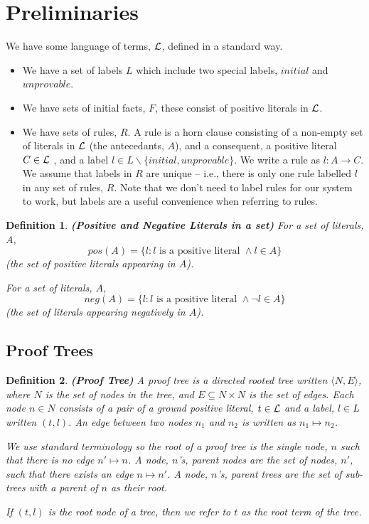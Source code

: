 \documentclass{blue-book}
\newtheorem{definition}{Definition}
\newcommand{\drule}[3]{\ensuremath{#1:#2 \rightarrow #3}}
\newcommand{\pt}[2]{\ensuremath{\langle #1,#2 \rangle}}
\newcommand{\node}[2]{\ensuremath{(#1, #2)}}
\newcommand{\edge}[2]{\ensuremath{#1 \mapsto #2}}
\begin{document}
\section{Preliminaries}
We have some language of terms, ${\cal L}$, defined in a standard way.

\begin{itemize}
\item We have a set of labels $L$ which include two special labels, $initial$ and $unprovable$. 

\item We have sets of initial facts, $F$, these consist of positive literals in ${\cal L}$.

\item We have sets of rules, $R$.  A rule is a horn clause consisting of a non-empty set of literals in ${\cal L}$ (the antecedants, $A$), and a consequent, a positive literal $C \in {\cal L}$ , and a label $l \in L \backslash \{initial, unprovable\}$.  We write a rule as $\drule{l}{A}{C}$.  We assume that labels in $R$ are unique -- i.e., there is only one rule labelled $l$ in any set of rules, $R$.  Note that we don't need to label rules for our system to work, but labels are a useful convenience when referring to rules.
\end{itemize}

\begin{definition}{\bf (Positive and Negative Literals in a set)}
For a set of literals, $A$, $$pos(A) = \{l: l \text{ is a positive literal } \wedge l \in A\}$$ (the set of positive literals appearing in $A$).

For a set of literals, $A$, $$neg(A) = \{l: l \text{ is a positive literal } \wedge \neg l \in A\}$$ (the set of literals appearing negatively in $A$).
\end{definition}

\subsection{Proof Trees}

\begin{definition}{\bf (Proof Tree)}
\label{def:proof_tree}
A proof tree is a directed rooted tree written $\pt{N}{E}$, where $N$ is the set of nodes in the tree, and $E \subseteq N \times N$ is the set of edges.  Each node $n \in N$ consists of a pair of a ground positive literal, $t \in {\cal L}$ and a label, $l \in L$ written $\node{t}{l}$.  An edge between two nodes $n_1$ and $n_2$ is written as $\edge{n_1}{n_2}$.

We use standard terminology so the root of a proof tree is the single node, $n$ such that there is no edge $\edge{n'}{n}$.  A node, $n$'s, parent nodes are the set of nodes, $n'$, such that there exists an edge $\edge{n}{n'}$.  A node, $n$'s, parent trees are the set of sub-trees with a parent of $n$ as their root.

If $\node{t}{l}$ is the root node of a tree, then we refer to $t$ as the \emph{root term} of the tree.
\end{definition}
\end{document}

